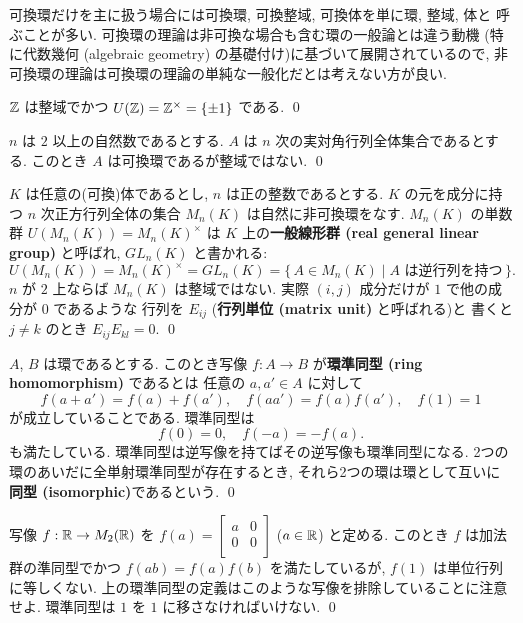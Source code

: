 \documentclass[12pt,twoside]{jarticle}
\begin{document}
可換環だけを主に扱う場合には可換環, 可換整域, 可換体を単に環, 整域, 体と
呼ぶことが多い. 可換環の理論は非可換な場合も含む環の一般論とは違う動機
(特に{代数幾何 (algebraic geometry)} の基礎付け)に基づいて展開されているので, 
非可換環の理論は可換環の理論の単純な一般化だとは考えない方が良い.

\begin{example}
 ${\mathbb Z}$ は整域でかつ $U({\mathbb Z})={\mathbb Z}^{\times}=\{\pm 1\}$ である.
 \qed
\end{example}

\begin{example}
 $n$ は $2$ 以上の自然数であるとする.
 $A$ は $n$ 次の実対角行列全体集合であるとする.
 このとき $A$ は可換環であるが整域ではない.
 \qed
\end{example}

\begin{example}[行列環]
 $K$ は任意の(可換)体であるとし, $n$ は正の整数であるとする.
 $K$ の元を成分に持つ $n$ 次正方行列全体の集合 $M_n(K)$ は自然に非可換環をなす.
 $M_n(K)$ の単数群 $U(M_n(K))=M_n(K)^\times$ は %
 $K$ 上の{\bf 一般線形群 (real general linear group)} と呼ばれ, 
 $GL_n(K)$ と書かれる:
 \begin{equation*}
  U(M_n(K))=M_n(K)^\times=
  GL_n(K) = \{\,A\in M_n(K)\mid \text{$A$ は逆行列を持つ}\,\}.
 \end{equation*}
 $n$ が $2$ 上ならば $M_n(K)$ は整域ではない. 
 実際 $(i,j)$ 成分だけが $1$ で他の成分が $0$ であるような
 行列を $E_{ij}$ ({\bf 行列単位 (matrix unit)} と呼ばれる)と
 書くと $j\ne k$ のとき $E_{ij}E_{kl}=0$.
 \qed
\end{example}

\begin{definition}[環準同型]
 $A$, $B$ は環であるとする. 
 このとき写像 $f:A\to B$ が{\bf 環準同型 (ring homomorphism)} であるとは
 任意の $a,a'\in A$ に対して
 \begin{equation*}
  f(a+a')=f(a)+f(a'), \quad f(aa')=f(a)f(a'), \quad f(1)=1
 \end{equation*}
 が成立していることである. 環準同型は
 \begin{equation*}
  f(0) = 0, \quad f(-a)=-f(a).
 \end{equation*}
 も満たしている.
 環準同型は逆写像を持てばその逆写像も環準同型になる.
 2つの環のあいだに全単射環準同型が存在するとき, 
 それら2つの環は環として互いに{\bf 同型 (isomorphic)}であるという.
 \qed
\end{definition}

\begin{example}
 写像 $f:{\mathbb R}\to M_2({\mathbb R})$ 
 を $f(a)=\begin{bmatrix} a & 0 \\ 0 & 0 \\\end{bmatrix}$ ($a\in{\mathbb R}$) と定める.
 このとき $f$ は加法群の準同型でかつ $f(ab)=f(a)f(b)$ を満たしているが, 
 $f(1)$ は単位行列に等しくない. 
 上の環準同型の定義はこのような写像を排除していることに注意せよ.
 環準同型は $1$ を $1$ に移さなければいけない.
 \qed
\end{example}
\end{document}
